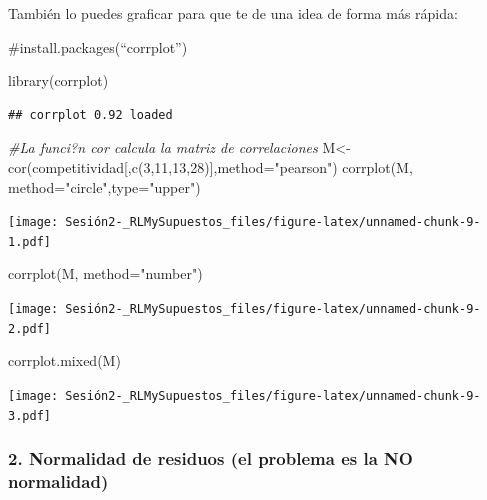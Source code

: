 \documentclass[
]{article}
\newenvironment{Shaded}{\begin{snugshade}}{\end{snugshade}}
\newcommand{\AttributeTok}[1]{\textcolor[rgb]{0.77,0.63,0.00}{#1}}
\newcommand{\CommentTok}[1]{\textcolor[rgb]{0.56,0.35,0.01}{\textit{#1}}}
\newcommand{\DecValTok}[1]{\textcolor[rgb]{0.00,0.00,0.81}{#1}}
\newcommand{\FunctionTok}[1]{\textcolor[rgb]{0.00,0.00,0.00}{#1}}
\newcommand{\NormalTok}[1]{#1}
\newcommand{\OtherTok}[1]{\textcolor[rgb]{0.56,0.35,0.01}{#1}}
\newcommand{\StringTok}[1]{\textcolor[rgb]{0.31,0.60,0.02}{#1}}
\begin{document}
También lo puedes graficar para que te de una idea de forma más rápida:

\#install.packages(``corrplot'')

\begin{Shaded}
\begin{Highlighting}[]
\FunctionTok{library}\NormalTok{(corrplot)}
\end{Highlighting}
\end{Shaded}

\begin{verbatim}
## corrplot 0.92 loaded
\end{verbatim}

\begin{Shaded}
\begin{Highlighting}[]
\CommentTok{\#La funci?n cor calcula la matriz de correlaciones}
\NormalTok{M}\OtherTok{\textless{}{-}}\FunctionTok{cor}\NormalTok{(competitividad[,}\FunctionTok{c}\NormalTok{(}\DecValTok{3}\NormalTok{,}\DecValTok{11}\NormalTok{,}\DecValTok{13}\NormalTok{,}\DecValTok{28}\NormalTok{)],}\AttributeTok{method=}\StringTok{"pearson"}\NormalTok{)}
\FunctionTok{corrplot}\NormalTok{(M, }\AttributeTok{method=}\StringTok{"circle"}\NormalTok{,}\AttributeTok{type=}\StringTok{"upper"}\NormalTok{)}
\end{Highlighting}
\end{Shaded}

\texttt{[image: Sesión2-\_RLMySupuestos\_files/figure-latex/unnamed-chunk-9-1.pdf]}

\begin{Shaded}
\begin{Highlighting}[]
\FunctionTok{corrplot}\NormalTok{(M, }\AttributeTok{method=}\StringTok{"number"}\NormalTok{)}
\end{Highlighting}
\end{Shaded}

\texttt{[image: Sesión2-\_RLMySupuestos\_files/figure-latex/unnamed-chunk-9-2.pdf]}

\begin{Shaded}
\begin{Highlighting}[]
\FunctionTok{corrplot.mixed}\NormalTok{(M)}
\end{Highlighting}
\end{Shaded}

\texttt{[image: Sesión2-\_RLMySupuestos\_files/figure-latex/unnamed-chunk-9-3.pdf]}

\hypertarget{normalidad-de-residuos-el-problema-es-la-no-normalidad}{%
\subsubsection{2. Normalidad de residuos (el problema es la NO
normalidad)}\label{normalidad-de-residuos-el-problema-es-la-no-normalidad}}
\end{document}
